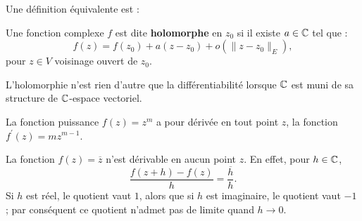 Une définition équivalente est :
\begin{fdefn}
Une fonction complexe $f$ est dite \textbf{holomorphe} en $z_0$ si il existe $a \in \mathbb{C}$ tel que :
\[f(z)=f(z_0) + a(z-z_0) + o(\|z-z_0\|_E),\] pour $z \in V$ voisinage ouvert de $z_0$.
\end{fdefn}
\begin{rem}
  L'holomorphie n'est rien d'autre que la différentiabilité lorsque $\mathbb{C}$ est muni de sa structure de $\mathbb{C}$-espace vectoriel.
\end{rem}



\begin{exem}
La fonction puissance $f(z)=z^m$ a pour dérivée en tout point $z$, la fonction $f^\prime (z)=m z^{m-1}$. \end{exem}
\begin{exem}
 La fonction $f(z)=\overline{z}$ n'est dérivable en aucun point $z$. En effet, pour $h \in \mathbb{C}$,
\[\frac{f(z + h) - f(z)}{h}= \frac{\overline{h}}{h}.\]
Si $h$ est réel, le quotient vaut $1$, alors que si $h$ est imaginaire, le quotient vaut $-1$ ; par conséquent ce quotient n'admet pas de limite quand $h \rightarrow 0$. 
\end{exem}

